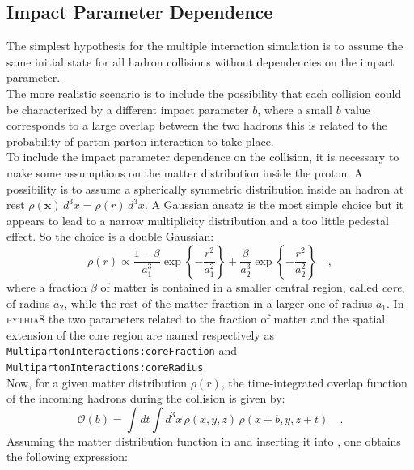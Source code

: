 \subsection{Impact Parameter Dependence}

The simplest hypothesis for the multiple interaction simulation is to assume the same initial state for all hadron collisions without dependencies on the impact parameter. 
\\
The more realistic scenario is to include the possibility that each collision could be characterized by a different impact parameter $b$, where a small $b$ value corresponds to a large overlap between the two hadrons this is related to the probability of parton-parton interaction to take place.
\\
To include the impact parameter dependence on the collision, it is necessary to make some assumptions on the matter distribution inside the proton. A possibility is to assume a spherically symmetric distribution inside an hadron at rest $\rho(\mathbf{x})\,d^3x=\rho(r)\,d^3x$. A Gaussian ansatz is the most simple choice but it appears to lead to a narrow multiplicity distribution and a too little pedestal effect. So the choice is a double Gaussian:
\begin{equation}
	\rho(r) \propto \frac{1-\beta}{a_1^3}\exp\left\{-\frac{r^2}{a_1^2}\right\}+\frac{\beta}{a_2^3}\exp\left\{ -\frac{r^2}{a_2^2} \right\}\quad,
	\label{eq:matterDistribution}
\end{equation}
where a fraction $\beta$ of matter is contained in a smaller central region, called \textit{core}, of radius $a_2$, while the rest of the matter fraction in a larger one of radius $a_1$. In \textsc{pythia8} the two parameters related to the fraction of matter and the spatial extension of the core region are named respectively as \texttt{Multiparton}\-\texttt{Interactions:}\-\texttt{core}\-\texttt{Fraction} and \texttt{Multiparton}\-\texttt{Interactions:}\-\texttt{core}\-\texttt{Radius}.
\\
Now, for a given matter distribution $\rho(r)$,  the time-integrated overlap function of the incoming hadrons during the collision is given by:
\begin{equation}
	\mathcal{O}(b)=\displaystyle\int dt \displaystyle\int d^3x\,\rho(x,y,z)\,\rho(x+b,y,z+t)\quad.
	\label{eq:overlappingFunction}
\end{equation} 
Assuming the matter distribution function in  and inserting it into , one obtains the following expression:
